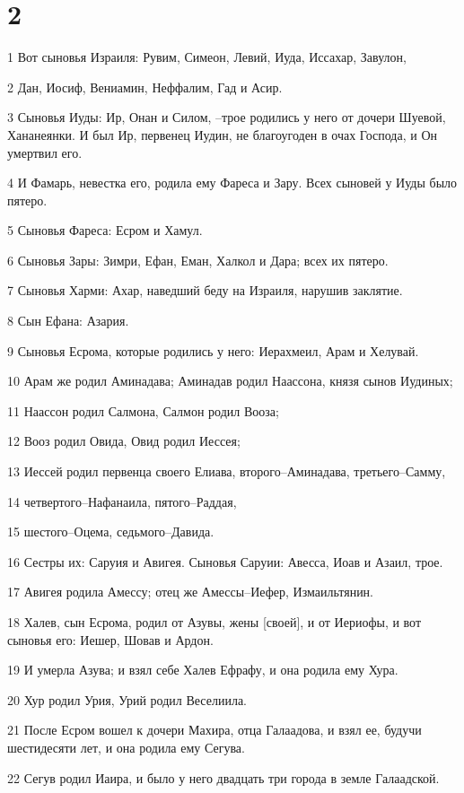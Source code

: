 \chapter{2}

\par 1 Вот сыновья Израиля: Рувим, Симеон, Левий, Иуда, Иссахар, Завулон,
\par 2 Дан, Иосиф, Вениамин, Неффалим, Гад и Асир.
\par 3 Сыновья Иуды: Ир, Онан и Силом, --трое родились у него от дочери Шуевой, Хананеянки. И был Ир, первенец Иудин, не благоугоден в очах Господа, и Он умертвил его.
\par 4 И Фамарь, невестка его, родила ему Фареса и Зару. Всех сыновей у Иуды было пятеро.
\par 5 Сыновья Фареса: Есром и Хамул.
\par 6 Сыновья Зары: Зимри, Ефан, Еман, Халкол и Дара; всех их пятеро.
\par 7 Сыновья Харми: Ахар, наведший беду на Израиля, нарушив заклятие.
\par 8 Сын Ефана: Азария.
\par 9 Сыновья Есрома, которые родились у него: Иерахмеил, Арам и Хелувай.
\par 10 Арам же родил Аминадава; Аминадав родил Наассона, князя сынов Иудиных;
\par 11 Наассон родил Салмона, Салмон родил Вооза;
\par 12 Вооз родил Овида, Овид родил Иессея;
\par 13 Иессей родил первенца своего Елиава, второго--Аминадава, третьего--Самму,
\par 14 четвертого--Нафанаила, пятого--Раддая,
\par 15 шестого--Оцема, седьмого--Давида.
\par 16 Сестры их: Саруия и Авигея. Сыновья Саруии: Авесса, Иоав и Азаил, трое.
\par 17 Авигея родила Амессу; отец же Амессы--Иефер, Измаильтянин.
\par 18 Халев, сын Есрома, родил от Азувы, жены [своей], и от Иериофы, и вот сыновья его: Иешер, Шовав и Ардон.
\par 19 И умерла Азува; и взял себе Халев Ефрафу, и она родила ему Хура.
\par 20 Хур родил Урия, Урий родил Веселиила.
\par 21 После Есром вошел к дочери Махира, отца Галаадова, и взял ее, будучи шестидесяти лет, и она родила ему Сегува.
\par 22 Сегув родил Иаира, и было у него двадцать три города в земле Галаадской.
